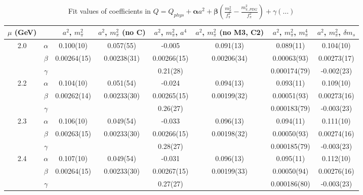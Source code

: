 \documentclass[12pt]{extarticle}
\begin{document}
\begin{table}[h!]
\begin{center}
\begin{tabular}{|c c|c|c|c|c|c|c|}
\hline
$\mu$ (GeV) &  & $a^2$, $m_\pi^2$& $a^2$, $m_\pi^2$ (no C)& $a^2$, $m_\pi^2$, $a^4$& $a^2$, $m_\pi^2$ (no M3, C2)& $a^2$, $m_\pi^2$, $m_\pi^4$& $a^2$, $m_\pi^2$, $\delta m_s$\\
\hline
\multirow{3}{0.5in}{2.0} & $\alpha$ & 0.100(10)& 0.057(55)& -0.005& 0.091(13)& 0.089(11)& 0.104(10)\\
 & $\beta$ & 0.00264(15)& 0.00238(31)& 0.00266(15)& 0.00206(34)& 0.00063(93)& 0.00273(17)\\
 & $\gamma$ &  &  & 0.21(28)&  & 0.000174(79)& -0.002(23)\\
\hline
\multirow{3}{0.5in}{2.2} & $\alpha$ & 0.104(10)& 0.051(54)& -0.024& 0.094(13)& 0.093(11)& 0.109(10)\\
 & $\beta$ & 0.00262(14)& 0.00233(30)& 0.00265(15)& 0.00199(32)& 0.00051(93)& 0.00273(16)\\
 & $\gamma$ &  &  & 0.26(27)&  & 0.000183(79)& -0.003(23)\\
\hline
\multirow{3}{0.5in}{2.3} & $\alpha$ & 0.106(10)& 0.049(54)& -0.033& 0.096(13)& 0.094(11)& 0.111(10)\\
 & $\beta$ & 0.00263(15)& 0.00233(30)& 0.00266(15)& 0.00198(32)& 0.00050(93)& 0.00274(16)\\
 & $\gamma$ &  &  & 0.28(27)&  & 0.000185(79)& -0.003(23)\\
\hline
\multirow{3}{0.5in}{2.4} & $\alpha$ & 0.107(10)& 0.049(54)& -0.031& 0.096(13)& 0.095(11)& 0.112(10)\\
 & $\beta$ & 0.00264(15)& 0.00233(30)& 0.00267(15)& 0.00199(33)& 0.00050(94)& 0.00276(16)\\
 & $\gamma$ &  &  & 0.27(27)&  & 0.000186(80)& -0.003(23)\\
\hline
\end{tabular}
\caption{Fit values of coefficients in $Q = Q_{phys} + \mathbf{\alpha} a^2 + \mathbf{\beta}\left(\frac{m_\pi^2}{f_\pi^2}-\frac{m_{\pi,PDG}^2}{f_\pi^2}\right) + \gamma(\ldots)$}
\end{center}
\end{table}







\end{document}
